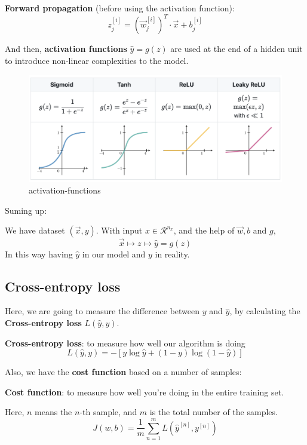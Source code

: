\documentclass[11pt, a4paper]{article}
\begin{document}
\begin{tcolorbox}
    \textbf{Forward propagation} (before using the activation function):
   \[
       z_j^{[i]} = (\vec{w}_j^{[i]})^{T} \cdot \vec{x} + b_j^{[i]}
   \]
\end{tcolorbox}

And then, \textbf{activation functions} $\hat{y}=g(z)$ are used at the end of a hidden unit to introduce non-linear complexities to the model.

\begin{figure}[H] %
    \centering
    \includegraphics[width=\textwidth]{./fig/activation-functions.png}
    \caption{activation-functions}
    \label{fig:activation-functions}
\end{figure}

Suming up:

\begin{tcolorbox}
    We have dataset $(\vec{x},y)$. With input $x\in \mathcal{R}^{n_x}$, and the help of $\vec{w},b$ and $g$,
\[
    \vec{x} \mapsto z \mapsto \hat{y} = g(z)
\]
    In this way having $\hat{y}$ in our model and $y$ in reality.
\end{tcolorbox}
\subsection{Cross-entropy loss}
Here, we are going to measure the difference between $y$ and $\hat{y}$, by calculating the \textbf{Cross-entropy loss} $L(\hat{y},y)$.

\begin{tcolorbox}
    \textbf{Cross-entropy loss}: to measure how well our algorithm is doing
    \[
    L(\hat{y},y) = -[y\log \hat{y}+(1-y)\log (1-\hat{y})]
    \]
\end{tcolorbox}

Also, we have the \textbf{cost function} based on a number of samples:

\begin{tcolorbox}
    \textbf{Cost function}: to measure how well you're doing in the entire training set.

    Here, $n$ means the $n$-th sample, and $m$ is the total number of the samples.
    \[
        J(w,b) = \frac{1}{m} \sum_{n=1}^{m} L(\hat{y}^{[n]}, y ^{[n]})
    \]
\end{tcolorbox}
\end{document}

